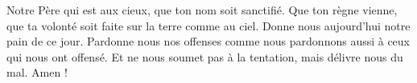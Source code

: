 

Notre Père qui est aux cieux, que ton nom soit sanctifié.
Que ton règne vienne, que ta volonté soit faite sur la terre comme au ciel.
Donne nous aujourd'hui notre pain de ce jour.
Pardonne nous nos offenses comme nous pardonnons aussi
à ceux qui nous ont offensé.
Et ne nous soumet pas à la tentation,
mais délivre nous du mal. Amen !

